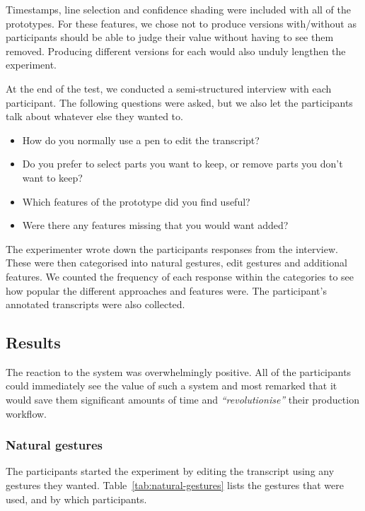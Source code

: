 Timestamps, line selection and confidence shading were included with all of the prototypes. For these features, we
chose not to produce versions with/without as participants should be able to judge their value without having to see
them removed. Producing different versions for each would also unduly lengthen the experiment.

At the end of the test, we conducted a semi-structured interview with each participant. The following questions were
asked, but we also let the participants talk about whatever else they wanted to.

{\singlespacing
  \begin{itemize}
    \item How do you normally use a pen to edit the transcript?
    \item Do you prefer to select parts you want to keep, or remove parts you don't want to keep?
    \item Which features of the prototype did you find useful?
    \item Were there any features missing that you would want added?
  \end{itemize}
}

The experimenter wrote down the participants responses from the interview. These were then categorised into natural
gestures, edit gestures and additional features. We counted the frequency of each response within the categories to
see how popular the different approaches and features were. The participant's annotated transcripts were also
collected.

\subsection{Results}
The reaction to the system was overwhelmingly positive. All of the participants could immediately see the value of such
a system and most remarked that it would save them significant amounts of time and \textit{``revolutionise''} their
production workflow.

\subsubsection{Natural gestures}

The participants started the experiment by editing the transcript using any gestures they wanted.
Table~\ref{tab:natural-gestures} lists the gestures that were used, and by which participants.

